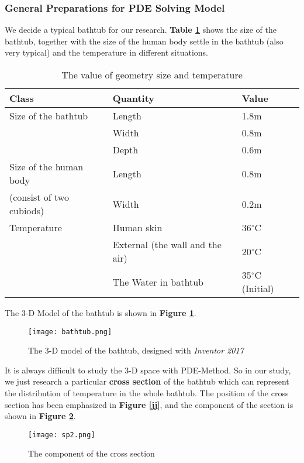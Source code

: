 \documentclass{HZNUMCM}
\begin{document}
\subsubsection{General Preparations for PDE Solving Model}
We decide a typical bathtub for our research. \textbf{Table \ref{tb1}} shows the size of the
bathtub, together with the size of the human body settle in the bathtub (also very typical) and the
temperature in different situations.
\begin{table}[!htbp]
\begin{center}
\caption{The value of geometry size and temperature}
\begin{tabular}{lll}
    \toprule
    Class&Quantity&Value\\
    \midrule
    Size of the bathtub&Length&1.8m\\
    &Width&0.8m\\
    &Depth&0.6m\\
    \midrule
    Size of the human body&Length&0.8m\\
    (consist of two cubiods)&Width&0.2m\\
    \midrule
    Temperature&Human skin&36$^\circ$C\\
    &External (the wall and the air)&20$^\circ$C\\
    &The Water in bathtub&35$^\circ$C (Initial)\\
    \bottomrule
\end{tabular}\label{tb1}
\end{center}
\end{table}

The 3-D Model of the bathtub is shown in \textbf{Figure \ref{md}}.
\begin{figure}[!htbp]
\small
\centering
\texttt{[image: bathtub.png]}
\caption{The 3-D model of the bathtub, designed with \emph{Inventor 2017}}\label{md}
\end{figure}

It is always difficult to study the 3-D space with PDE-Method. So in our study, we just research a
particular \textbf{cross section} of the bathtub which can represent the distribution of temperature
in the whole bathtub. The position of the cross section has been emphasized in \textbf{Figure
\ref{jj}}, and the component of the section is shown in \textbf{Figure \ref{cs}}.
\begin{figure}[!htbp]
    \small
    \centering
    \texttt{[image: sp2.png]}
    \caption{The component of the cross section}\label{cs}
\end{figure}
\end{document}
